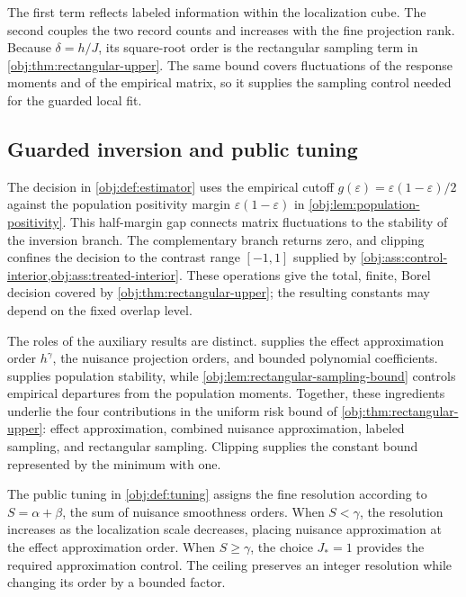 The first term reflects labeled information within the localization cube. The second couples the two record counts and increases with the fine projection rank. Because \(\delta=h/J\), its square-root order is the rectangular sampling term in \cref{obj:thm:rectangular-upper}. The same bound covers fluctuations of the response moments and of the empirical matrix, so it supplies the sampling control needed for the guarded local fit.

\subsection{Guarded inversion and public tuning}

The decision in \cref{obj:def:estimator} uses the empirical cutoff \(g(\varepsilon)=\varepsilon(1-\varepsilon)/2\) against the population positivity margin \(\varepsilon(1-\varepsilon)\) in \cref{obj:lem:population-positivity}. This half-margin gap connects matrix fluctuations to the stability of the inversion branch. The complementary branch returns zero, and clipping confines the decision to the contrast range \([-1,1]\) supplied by \cref{obj:ass:control-interior,obj:ass:treated-interior}. These operations give the total, finite, Borel decision covered by \cref{obj:thm:rectangular-upper}; the resulting constants may depend on the fixed overlap level.

The roles of the auxiliary results are distinct.  supplies the effect approximation order \(h^\gamma\), the nuisance projection orders, and bounded polynomial coefficients.  supplies population stability, while \cref{obj:lem:rectangular-sampling-bound} controls empirical departures from the population moments. Together, these ingredients underlie the four contributions in the uniform risk bound of \cref{obj:thm:rectangular-upper}: effect approximation, combined nuisance approximation, labeled sampling, and rectangular sampling. Clipping supplies the constant bound represented by the minimum with one.

The public tuning in \cref{obj:def:tuning} assigns the fine resolution according to \(S=\alpha+\beta\), the sum of nuisance smoothness orders. When \(S<\gamma\), the resolution increases as the localization scale decreases, placing nuisance approximation at the effect approximation order. When \(S\ge\gamma\), the choice \(J_*=1\) provides the required approximation control. The ceiling preserves an integer resolution while changing its order by a bounded factor.

